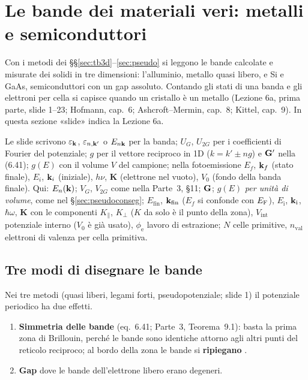\documentclass[11pt,a4paper]{article}
\begin{document}
\section{Le bande dei materiali veri: metalli e semiconduttori}\label{sec:reali}
Con i metodi dei §§\ref{sec:tb3d}--\ref{sec:pseudo} si leggono le bande calcolate e misurate dei solidi in tre dimensioni: l'alluminio, metallo
quasi libero, e Si e GaAs, semiconduttori con un gap assoluto. Contando gli stati di una banda e gli elettroni per cella si capisce quando un cristallo
è un metallo (Lezione 6a, prima parte, slide 1--23; Hofmann, cap.~6; Ashcroft--Mermin, cap.~8; Kittel, cap.~9). In questa sezione «slide» indica la
Lezione 6a.

\begin{osservazione}[notazione]
Le slide scrivono $\varepsilon_{\mathbf k}$, $\varepsilon_{n,\mathbf k'}$ o $E_{n\mathbf k}$ per la banda; $U_G$, $U_{2G}$ per i coefficienti di Fourier del potenziale;
$g$ per il vettore reciproco in 1D ($k=k'\pm ng$) e $\mathbf G'$ nella (6.41); $g(E)$ con il volume $V$ del campione; nella fotoemissione $E_f$, $\mathbf k_f$
(stato finale), $E_i$, $\mathbf k_i$ (iniziale), $h\nu$, $\mathbf K$ (elettrone nel vuoto), $V_0$ (fondo della banda finale). Qui: $E_n(\mathbf k)$; $V_G$,
$V_{2G}$ come nella Parte~3, §11; $\mathbf G$; $g(E)$ \emph{per unità di volume}, come nel §\ref{sec:pseudoconseg}; $E_{\mathrm{fin}}$, $\mathbf k_{\mathrm{fin}}$
($E_f$ si confonde con $E_{\mathrm F}$), $E_{\mathrm i}$, $\mathbf k_{\mathrm i}$, $\hbar\omega$, $\mathbf K$ con le componenti $K_\parallel$, $K_\perp$ ($K$ da solo è il
punto della zona), $V_{\mathrm{int}}$ potenziale interno ($V_0$ è già usato), $\phi_{\mathrm e}$ lavoro di estrazione; $N$ celle primitive,
$n_{\mathrm{val}}$ elettroni di valenza per cella primitiva.
\end{osservazione}

\subsection{Tre modi di disegnare le bande}\label{sec:schemi}
Nei tre metodi (quasi liberi, legami forti, pseudopotenziale; slide 1) il potenziale periodico ha due effetti.
\begin{enumerate}[leftmargin=*, label=\arabic*.]
\item \textbf{Simmetria delle bande} (eq.~6.41; Parte~3, Teorema~9.1): basta la prima zona di Brillouin, perché le bande sono identiche attorno
agli altri punti del reticolo reciproco; al bordo della zona le bande si \textbf{ripiegano} .
\item \textbf{Gap} dove le bande dell'elettrone libero erano degeneri.
\end{enumerate}
\end{document}
